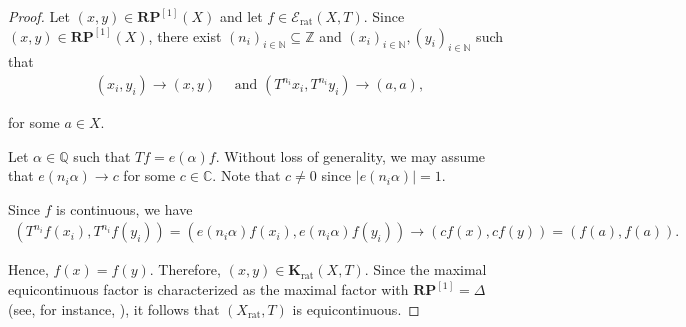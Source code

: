 \documentclass[11pt,reqno]{amsart}
\newcommand{\C}{\mathbb{C}}
\newcommand{\Q}{\mathbb{Q}}
\newcommand{\Z}{\mathbb{Z}}
\newcommand{\N}{\mathbb{N}}
\newcommand{\RP}{\mathbf{RP}}
\newcommand{\Krat}{\mathbf{K}_{\operatorname{rat}}}
\theoremstyle{definition}
\theoremstyle{remark}
\begin{document}
\begin{proof}
    Let $(x,y)\in \RP^{[1]}(X)$ and let $f\in\mathcal{E}_{\operatorname{rat}}(X,T)$. Since $(x,y)\in \RP^{[1]}(X)$, there exist $(n_i)_{i\in\N} \subseteq \Z$ and $(x_i)_{i\in\N},(y_{i})_{i\in \N}$ such that\begin{align*}
        (x_i,y_i)\to (x,y) \quad \text{ and } (T^{n_i}x_i,T^{n_i}y_i)\to (a,a),
    \end{align*}

    for some $a\in X$.

    Let $\alpha\in\Q$ such that $Tf = e(\alpha) f$. Without loss of generality, we may assume that $e(n_i\alpha)\to c$ for some $c\in \C$. Note that $c\neq 0$ since $|e(n_i\alpha)|=1$.
    
    Since $f$ is continuous, we have \begin{align*}
        (T^{n_i}f(x_i),T^{n_i}f(y_i))= (e(n_i\alpha)f(x_i),e(n_i\alpha)f(y_i))\to (cf(x),cf(y)) =(f(a),f(a)).
    \end{align*}

    Hence, $f(x)=f(y)$. Therefore, $(x,y)\in \Krat(X,T)$. Since the maximal equicontinuous factor is characterized as the maximal factor with $\RP^{[1]}=\Delta$ (see, for instance, {\cite[Chapter 9]{Auslander_minimal_flows_and_extensions:1988}}), it follows that $(X_{\operatorname{rat}},T)$ is equicontinuous.

    


    

    

\end{proof}
\end{document}
